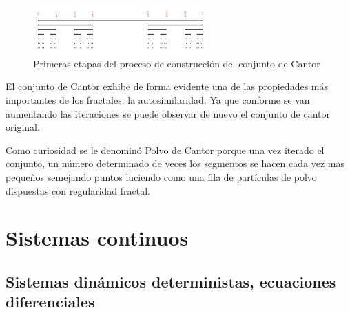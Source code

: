 \begin{figure}[hbtp]
\centering
\includegraphics[width = 0.6\textwidth]{img/conjuntoCantor.png}
\caption{Primeras etapas del proceso de construcción del conjunto de Cantor}
\label{fig:conjuntoCantor}
\end{figure}

El conjunto de Cantor exhibe de forma evidente una de las propiedades más importantes de los fractales: la autosimilaridad. Ya que conforme se van aumentando las iteraciones se puede observar de nuevo el conjunto de cantor original.

Como curiosidad se le denominó Polvo de Cantor porque una vez iterado el conjunto, un número determinado de veces los segmentos se hacen cada vez mas pequeños semejando puntos luciendo como una fila de partículas de polvo dispuestas con regularidad fractal.


\section{Sistemas continuos}

\subsection{Sistemas dinámicos deterministas, ecuaciones diferenciales}

